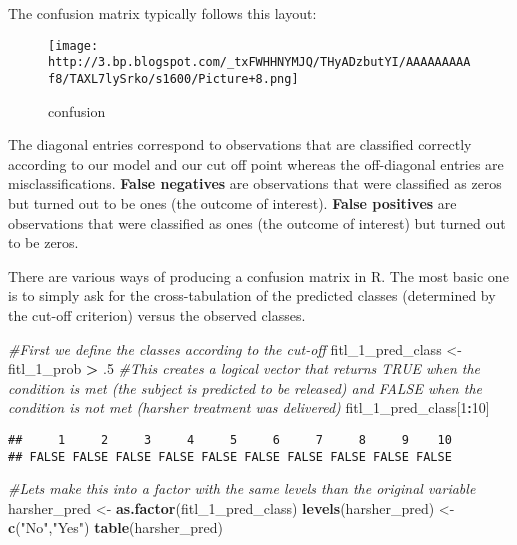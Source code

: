 \documentclass[
]{book}
\newenvironment{Shaded}{\begin{snugshade}}{\end{snugshade}}
\newcommand{\CommentTok}[1]{\textcolor[rgb]{0.56,0.35,0.01}{\textit{#1}}}
\newcommand{\DecValTok}[1]{\textcolor[rgb]{0.00,0.00,0.81}{#1}}
\newcommand{\FunctionTok}[1]{\textcolor[rgb]{0.13,0.29,0.53}{\textbf{#1}}}
\newcommand{\NormalTok}[1]{#1}
\newcommand{\OtherTok}[1]{\textcolor[rgb]{0.56,0.35,0.01}{#1}}
\newcommand{\SpecialCharTok}[1]{\textcolor[rgb]{0.81,0.36,0.00}{\textbf{#1}}}
\newcommand{\StringTok}[1]{\textcolor[rgb]{0.31,0.60,0.02}{#1}}
\begin{document}
The confusion matrix typically follows this layout:

\begin{figure}
\centering
\texttt{[image: http://3.bp.blogspot.com/\_txFWHHNYMJQ/THyADzbutYI/AAAAAAAAAf8/TAXL7lySrko/s1600/Picture+8.png]}
\caption{confusion}
\end{figure}

The diagonal entries correspond to observations that are classified correctly according to our model and our cut off point whereas the off-diagonal entries are misclassifications. \textbf{False negatives} are observations that were classified as zeros but turned out to be ones (the outcome of interest). \textbf{False positives} are observations that were classified as ones (the outcome of interest) but turned out to be zeros.

There are various ways of producing a confusion matrix in R. The most basic one is to simply ask for the cross-tabulation of the predicted classes (determined by the cut-off criterion) versus the observed classes.

\begin{Shaded}
\begin{Highlighting}[]
\CommentTok{\#First we define the classes according to the cut{-}off}
\NormalTok{fitl\_1\_pred\_class }\OtherTok{\textless{}{-}}\NormalTok{ fitl\_1\_prob }\SpecialCharTok{\textgreater{}}\NormalTok{ .}\DecValTok{5}
\CommentTok{\#This creates a logical vector that returns TRUE when the condition is met (the subject is predicted to be released) and FALSE when the condition is not met (harsher treatment was delivered)}
\NormalTok{fitl\_1\_pred\_class[}\DecValTok{1}\SpecialCharTok{:}\DecValTok{10}\NormalTok{]}
\end{Highlighting}
\end{Shaded}

\begin{verbatim}
##     1     2     3     4     5     6     7     8     9    10 
## FALSE FALSE FALSE FALSE FALSE FALSE FALSE FALSE FALSE FALSE
\end{verbatim}

\begin{Shaded}
\begin{Highlighting}[]
\CommentTok{\#Let\textquotesingle{}s make this into a factor with the same levels than the original variable}
\NormalTok{harsher\_pred }\OtherTok{\textless{}{-}} \FunctionTok{as.factor}\NormalTok{(fitl\_1\_pred\_class)}
\FunctionTok{levels}\NormalTok{(harsher\_pred) }\OtherTok{\textless{}{-}} \FunctionTok{c}\NormalTok{(}\StringTok{"No"}\NormalTok{,}\StringTok{"Yes"}\NormalTok{)}
\FunctionTok{table}\NormalTok{(harsher\_pred)}
\end{Highlighting}
\end{Shaded}
\end{document}

